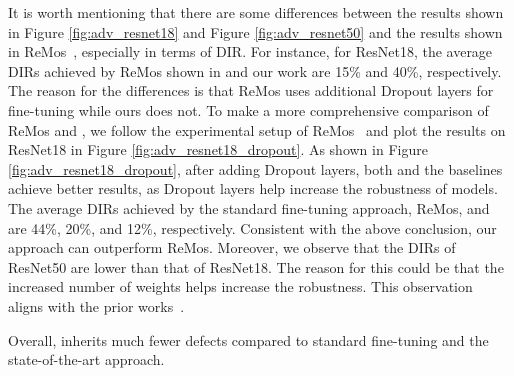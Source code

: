 It is worth mentioning that there are some differences between the results shown in Figure \ref{fig:adv_resnet18} and Figure \ref{fig:adv_resnet50} and the results shown in ReMos~\cite{ReMos}, especially in terms of DIR.
For instance, for ResNet18, the average DIRs achieved by ReMos shown in \cite{ReMos} and our work are 15\% and 40\%, respectively. 
The reason for the differences is that ReMos uses additional Dropout layers for fine-tuning while ours does not.
To make a more comprehensive comparison of ReMos and \projectName, we follow the experimental setup of ReMos~\cite{ReMos} and plot the results on ResNet18 in Figure \ref{fig:adv_resnet18_dropout}.
As shown in Figure \ref{fig:adv_resnet18_dropout}, after adding Dropout layers, both \projectName and the baselines achieve better results, as Dropout layers help increase the robustness of models. 
The average DIRs achieved by the standard fine-tuning approach, ReMos, and \projectName are 44\%, 20\%, and 12\%, respectively. 
Consistent with the above conclusion, our approach can outperform %
ReMos.
Moreover, we observe that the DIRs of ResNet50 are lower than that of ResNet18. 
The reason for this could be that the increased number of weights helps increase the robustness.
This observation aligns with the prior works~\cite{ReMos,adv_attack}.





\begin{tcolorbox}[left=2pt,right=2pt,top=2pt,bottom=2pt]
Overall, \projectName inherits much fewer defects compared to standard fine-tuning and the state-of-the-art approach. %
\end{tcolorbox}